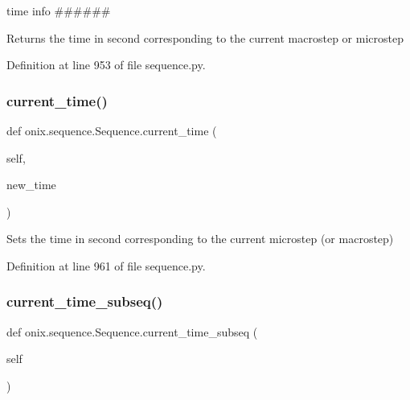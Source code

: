 time info \#\#\#\#\#\# 

\begin{DoxyVerb}Returns the time in second corresponding to the current macrostep or microstep
\end{DoxyVerb}
 

Definition at line 953 of file sequence.\+py.

\mbox{\label{classonix_1_1sequence_1_1Sequence_a860aaaea529e3888b2a08f3b1543aa6f}} 
\subsubsection{\texorpdfstring{current\+\_\+time()}{current\_time()}\hspace{0.1cm}{\footnotesize\ttfamily [2/2]}}
{\footnotesize\ttfamily def onix.\+sequence.\+Sequence.\+current\+\_\+time (\begin{DoxyParamCaption}\item[{}]{self,  }\item[{}]{new\+\_\+time }\end{DoxyParamCaption})}

\begin{DoxyVerb}Sets the time in second corresponding to the current microstep (or macrostep)
\end{DoxyVerb}
 

Definition at line 961 of file sequence.\+py.

\mbox{\label{classonix_1_1sequence_1_1Sequence_a12a657e78bd3b21ab49b47ef81ef83a7}} 
\subsubsection{\texorpdfstring{current\+\_\+time\+\_\+subseq()}{current\_time\_subseq()}}
{\footnotesize\ttfamily def onix.\+sequence.\+Sequence.\+current\+\_\+time\+\_\+subseq (\begin{DoxyParamCaption}\item[{}]{self }\end{DoxyParamCaption})}

